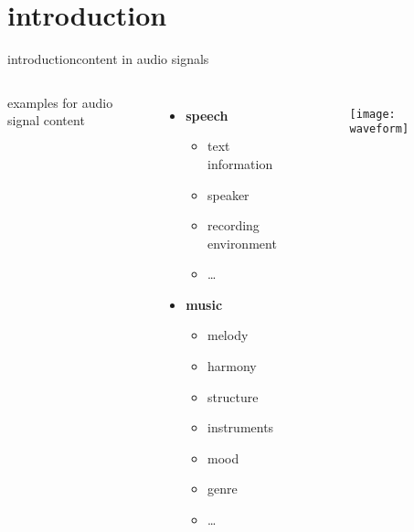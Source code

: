     \section[intro]{introduction}
        \begin{frame}{introduction}{content in audio signals}
             \begin{columns}
                examples for audio signal content
                \begin{itemize}
                    \item   \textbf{speech}
                        \begin{itemize}
                            \item   text information
                            \item   speaker
                            \item   recording environment
                            \item   \dots
                        \end{itemize}
                    \item   \textbf{music}
                        \begin{itemize}
                            \item   melody
                            \item   harmony
                            \item   structure
                            \item   instruments
                            \item   mood
                            \item   genre
                            \item   \dots
                        \end{itemize}
                \end{itemize}
                \begin{figure}
                    \texttt{[image: waveform]}
                \end{figure}
             \end{columns}
        \end{frame}
 
